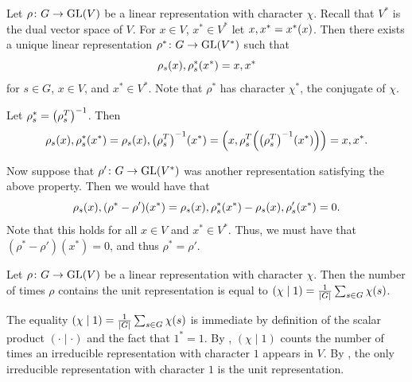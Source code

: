 \documentclass[letterpaper, 11pt, oneside]{book}
\begin{document}
\begin{exercise}
  Let $\rho\colon G \to \operatorname{GL}(V)$ be a linear representation with character $\chi$.
  Recall that $V^{*}$ is the dual vector space of $V$.
  For $x \in V$, $x^{*} \in V^{*}$ let $\inner{x, x^{*}} = x^{*}(x)$.
  Then there exists a unique linear representation $\rho^{*}\colon G \to \operatorname{GL}(V^{*})$ such that
  \[
    \inner{\rho_{s}(x), \rho_{s}^{*}(x^{*})} = \inner{x, x^{*}}
  \]
  for $s \in G$, $x \in V$, and $x^{*} \in V^{*}$.
  Note that $\rho^{*}$ has character $\chi^{*}$, the conjugate of $\chi$.
\end{exercise}
\begin{pf}
  Let $\rho_{s}^{*} = \pqty{\rho_{s}^{T}}^{-1}$.
  Then
  \[
    \inner{\rho_{s}(x), \rho_{s}^{*}(x^{*})} = \inner{\rho_{s}(x), \pqty{\rho_{s}^{T}}^{-1}(x^{*})} = \pqty{x, \rho_{s}^{T}\pqty{\pqty{\rho_{s}^{T}}^{-1}(x^{*})}} = \inner{x, x^{*}}.
  \]

  \clearpage

  Now suppose that $\rho'\colon G \to \operatorname{GL}(V^{*})$ was another representation satisfying the above property.
  Then we would have that
  \[
    \inner{\rho_{s}(x), (\rho^{*} - \rho')(x^{*})} = \inner{\rho_{s}(x), \rho_{s}^{*}(x^{*})} - \inner{\rho_{s}(x), \rho'_{s}(x^{*})} = 0.
  \]
  Note that this holds for all $x \in V$ and $x^{*} \in V^{*}$.
  Thus, we must have that $(\rho^{*} - \rho')(x^{*}) = 0$, and thus $\rho^{*} = \rho'$.
\end{pf}

\begin{exercise}\label{er:Serre_2_5}
  Let $\rho\colon G \to \operatorname{GL}(V)$ be a linear representation with character $\chi$.
  Then the number of times $\rho$ contains the unit representation is equal to $(\chi \mid 1) = \frac{1}{\abs{G}} \sum_{s \in G} \chi(s)$.
\end{exercise}
\begin{pf}
  The equality $(\chi \mid 1) = \frac{1}{\abs{G}} \sum_{s \in G} \chi(s)$ is immediate by definition of the scalar product $(\cdot \mid \cdot)$ and the fact that $1^{*} = 1$.
  By , $(\chi \mid 1)$ counts the number of times an irreducible representation with character $1$ appears in $V$.
  By , the only irreducible representation with character $1$ is the unit representation.
\end{pf}
\end{document}
